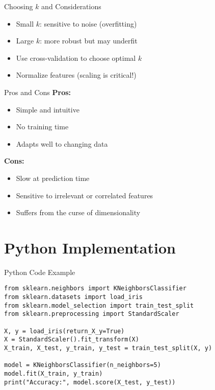 \documentclass{beamer}
\begin{document}
\begin{frame}{Choosing $k$ and Considerations}
  \begin{itemize}
    \item Small $k$: sensitive to noise (overfitting)
    \item Large $k$: more robust but may underfit
    \item Use cross-validation to choose optimal $k$
    \item Normalize features (scaling is critical!)
  \end{itemize}
\end{frame}

\begin{frame}{Pros and Cons}
  \textbf{Pros:}
  \begin{itemize}
    \item Simple and intuitive
    \item No training time
    \item Adapts well to changing data
  \end{itemize}
  \vspace{0.3cm}
  \textbf{Cons:}
  \begin{itemize}
    \item Slow at prediction time
    \item Sensitive to irrelevant or correlated features
    \item Suffers from the curse of dimensionality
  \end{itemize}
\end{frame}

\section{Python Implementation}
\begin{frame}[fragile]{Python Code Example}
\begin{tiny}
\begin{verbatim}
from sklearn.neighbors import KNeighborsClassifier
from sklearn.datasets import load_iris
from sklearn.model_selection import train_test_split
from sklearn.preprocessing import StandardScaler

X, y = load_iris(return_X_y=True)
X = StandardScaler().fit_transform(X)
X_train, X_test, y_train, y_test = train_test_split(X, y)

model = KNeighborsClassifier(n_neighbors=5)
model.fit(X_train, y_train)
print("Accuracy:", model.score(X_test, y_test))
\end{verbatim}
\end{tiny}
\end{frame}
\end{document}
